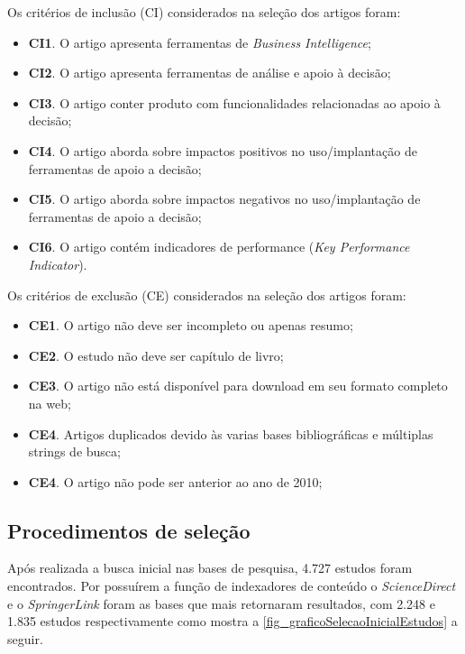Os critérios de inclusão (CI) considerados na seleção dos artigos foram:
\begin{itemize}
    \item \textbf{CI1}. O artigo apresenta ferramentas de \textit{Business Intelligence};
    \item \textbf{CI2}. O artigo apresenta ferramentas de análise e apoio à decisão;
    \item \textbf{CI3}. O artigo conter produto com funcionalidades relacionadas ao apoio à decisão;
    \item \textbf{CI4}. O artigo aborda sobre impactos positivos no uso/implantação de ferramentas de apoio a decisão;
    \item \textbf{CI5}. O artigo aborda sobre impactos negativos no uso/implantação de ferramentas de apoio a decisão;
    \item \textbf{CI6}. O artigo contém indicadores de performance (\textit{Key Performance Indicator}).
\end{itemize}

Os critérios de exclusão (CE) considerados na seleção dos artigos foram:
\begin{itemize}
    \item \textbf{CE1}. O artigo não deve ser incompleto ou apenas resumo;
    \item \textbf{CE2}. O estudo não deve ser capítulo de livro;
    \item \textbf{CE3}. O artigo não está disponível para download em seu formato completo na web;
    \item \textbf{CE4}. Artigos duplicados devido às varias bases bibliográficas e múltiplas  strings de busca;
    \item \textbf{CE4}. O artigo não pode ser anterior ao ano de 2010;
\end{itemize}


\subsection{Procedimentos de seleção}

Após realizada a busca inicial nas bases de pesquisa, 4.727 estudos foram encontrados. Por possuírem a função de indexadores de conteúdo o \textit{ScienceDirect} e o \textit{SpringerLink} foram as bases que mais retornaram resultados, com 2.248 e 1.835 estudos respectivamente como mostra a \autoref{fig_graficoSelecaoInicialEstudos} a seguir.
\newline
\newline

